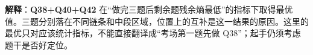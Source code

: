 \textbf{解释}：\textbf{Q38+Q40+Q42} 在“做完三题后剩余题残余熵最低”的指标下取得最优值。三题分别落在不同链条和中段区域，位置上的互补是这一结果的原因。这里的最优只对应该统计指标，不能直接翻译成“考场第一题先做 Q38”；起手仍须考虑题干是否好定位。